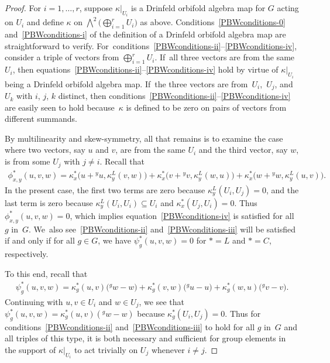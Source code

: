 \documentclass[pdftex]{sigma}
\numberwithin{equation}{section}
\newcommand{\actby}[1]{{}^{#1}}
\begin{document}
\begin{proof}
 For $i=1,\ldots,r$, suppose $\kappa|_{U_i}$ is a Drinfeld orbifold algebra map for $G$ acting on $U_i$ and define $\kappa$ on $\bigwedge^2\big(\bigoplus_{i=1}^r U_i\big)$ as above.
 Conditions~\eqref{PBWconditions-0} and~\eqref{PBWconditions-i} of the definition of a Drinfeld orbifold algebra map are straightforward to verify. For~conditions~\eqref{PBWconditions-ii}--\eqref{PBWconditions-iv}, consider a triple of vectors from $\bigoplus_{i=1}^r U_i$. If~all three vectors are from the same $U_i$, then equations~\eqref{PBWconditions-ii}--\eqref{PBWconditions-iv} hold by virtue of $\kappa|_{U_i}$ being a Drinfeld orbifold algebra map. If~the three vectors are from~$U_i$,~$U_j$, and~$U_k$ with $i$, $j$, $k$ distinct, then conditions~\eqref{PBWconditions-ii}--\eqref{PBWconditions-iv} are easily seen to hold because~$\kappa$ is defined to be zero on pairs of vectors from different summands.

 By multilinearity and skew-symmetry, all that remains is to examine the case where two vectors, say $u$ and $v$, are from the same $U_i$ and the third vector, say $w$, is from some $U_j$ with $j\neq i$. Recall that
 \begin{gather*}
 \phi_{x,y}^*(u,v,w)=\kappa_x^*\big(u+\actby{y}u,\kappa_y^L(v,w)\big) +\kappa_x^*\big(v+\actby{y}v,\kappa_y^L(w,u)\big)+\kappa_x^*\big(w+\actby{y}w,\kappa_y^L(u,v)\big).
 \end{gather*}
 In the present case, the first two terms are zero because $\kappa^L_y(U_i,U_j)=0$, and the last term is zero because $\kappa_y^L(U_i,U_i)\subseteq U_i$ and $\kappa^*_x(U_j,U_i)=0$. Thus $\phi_{x,y}^*(u,v,w)=0$, which implies equation~\eqref{PBWconditions-iv} is satisfied for all $g$ in~$G$. We~also see~\eqref{PBWconditions-ii} and~\eqref{PBWconditions-iii} will be satisfied if and only if for all $g\in G$, we have $\psi_g^*(u,v,w)=0$ for $*=L$ and $*=C$, respectively.

 To this end, recall that
 \begin{gather*}
 \psi_g^*(u,v,w)=\kappa_g^*(u,v)\big(\actby{g}w-w\big)+\kappa_g^*(v,w)\big(\actby{g}u-u\big)+ \kappa_g^*(w,u)\big(\actby{g}v-v\big).
 \end{gather*}
 Continuing with $u,v\in U_i$ and $w\in U_j$, we see that $\psi_g^*(u,v,w)=\kappa_g^*(u,v)(\actby{g}w-w)$ because $\kappa_g^*(U_i,U_j)=0$.
 Thus for conditions~\eqref{PBWconditions-ii} and~\eqref{PBWconditions-iii} to hold for all $g$ in~$G$ and all triples of this type, it is both necessary and sufficient for group elements in the support of $\kappa|_{U_i}$ to act trivially on $U_j$ whenever $i\neq j$.
\end{proof}
\end{document}
